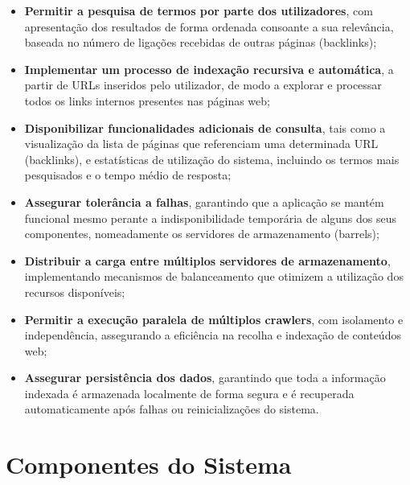 \documentclass{article}
\begin{document}
\begin{itemize} 
\item \textbf{Permitir a pesquisa de termos por parte dos utilizadores}, com apresentação dos resultados de forma ordenada consoante a sua relevância, baseada no número de ligações recebidas de outras páginas (backlinks);
\item \textbf{Implementar um processo de indexação recursiva e automática}, a partir de URLs inseridos pelo utilizador, de modo a explorar e processar todos os links internos presentes nas páginas web;

\item \textbf{Disponibilizar funcionalidades adicionais de consulta}, tais como a visualização da lista de páginas que referenciam uma determinada URL (backlinks), e estatísticas de utilização do sistema, incluindo os termos mais pesquisados e o tempo médio de resposta;

\item \textbf{Assegurar tolerância a falhas}, garantindo que a aplicação se mantém funcional mesmo perante a indisponibilidade temporária de alguns dos seus componentes, nomeadamente os servidores de armazenamento (barrels);

\item \textbf{Distribuir a carga entre múltiplos servidores de armazenamento}, implementando mecanismos de balanceamento que otimizem a utilização dos recursos disponíveis;

\item \textbf{Permitir a execução paralela de múltiplos crawlers}, com isolamento e independência, assegurando a eficiência na recolha e indexação de conteúdos web;

\item \textbf{Assegurar persistência dos dados}, garantindo que toda a informação indexada é armazenada localmente de forma segura e é recuperada automaticamente após falhas ou reinicializações do sistema.

\end{itemize}



















\newpage
\section{Componentes do Sistema}
\end{document}
